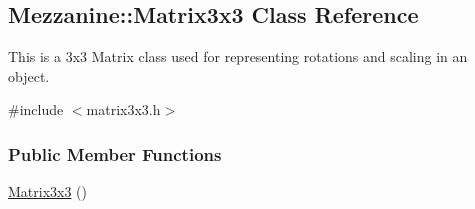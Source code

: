 \hypertarget{classMezzanine_1_1Matrix3x3}{
\subsection{Mezzanine::Matrix3x3 Class Reference}
\label{classMezzanine_1_1Matrix3x3}
}


This is a 3x3 Matrix class used for representing rotations and scaling in an object.  




{\ttfamily \#include $<$matrix3x3.h$>$}

\subsubsection*{Public Member Functions}
\begin{DoxyCompactItemize}
\item 
\hypertarget{classMezzanine_1_1Matrix3x3_a0d3ba81fd09fc8b6c8ec5a2220d3fb73}{
\hyperlink{classMezzanine_1_1Matrix3x3_a0d3ba81fd09fc8b6c8ec5a2220d3fb73}{Matrix3x3} ()}
\label{classMezzanine_1_1Matrix3x3_a0d3ba81fd09fc8b6c8ec5a2220d3fb73}


\end{DoxyCompactItemize}
